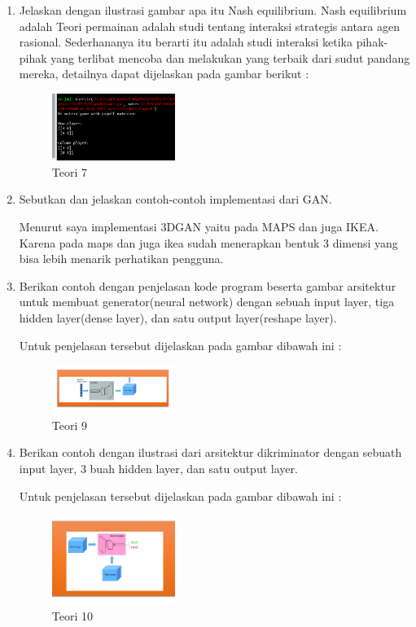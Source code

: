 \begin{enumerate}
	\item Jelaskan dengan ilustrasi gambar apa itu Nash equilibrium.
	\hfill\break
	Nash equilibrium adalah Teori permainan adalah studi tentang interaksi strategis antara agen rasional. Sederhananya itu berarti itu adalah studi interaksi ketika pihak-pihak yang terlibat mencoba dan melakukan yang terbaik dari sudut pandang mereka, detailnya dapat dijelaskan pada gambar berikut : 

	\begin{figure}[H]
	\centering
		\includegraphics[width=4cm]{figures/1174005/tugas8/materi/teori7.PNG}
		\caption{Teori 7}
	\end{figure}

	\item Sebutkan dan jelaskan contoh-contoh implementasi dari GAN.

	\hfill\break
	Menurut saya implementasi 3DGAN yaitu pada MAPS dan juga IKEA. Karena pada maps dan juga ikea sudah menerapkan bentuk 3 dimensi yang bisa lebih menarik perhatikan pengguna.

	\item Berikan contoh dengan penjelasan kode program beserta gambar arsitektur untuk membuat generator(neural network) dengan sebuah input layer, tiga hidden layer(dense layer), dan satu output layer(reshape layer).
	\hfill\break

	Untuk penjelasan tersebut dijelaskan pada gambar dibawah ini :

	\begin{figure}[H]
	\centering
		\includegraphics[width=4cm]{figures/1174005/tugas8/materi/teori9.PNG}
		\caption{Teori 9}
	\end{figure}

	\item Berikan contoh dengan ilustrasi dari arsitektur dikriminator dengan sebuath input layer, 3 buah hidden layer, dan satu output layer.
	\hfill\break

	Untuk penjelasan tersebut dijelaskan pada gambar dibawah ini :

	\begin{figure}[H]
	\centering
		\includegraphics[width=4cm]{figures/1174005/tugas8/materi/teori10.PNG}
		\caption{Teori 10}
	\end{figure}


\end{enumerate}
